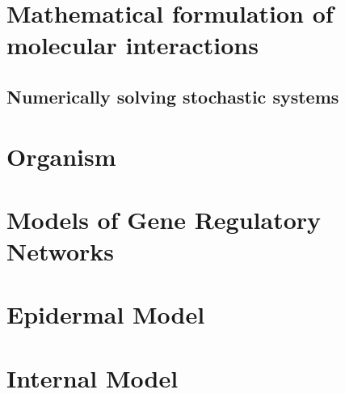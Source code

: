 \section[Stochastic Simulations]{Mathematical formulation of molecular
 interactions}
% 
% 

\subsection[Stochastic Simulations]{Numerically solving stochastic systems}

\section[Organism]{Organism}

\section[GRN Models]{Models of Gene Regulatory Networks}

\section[Epidermal]{Epidermal Model}

\section[Internal]{Internal Model}

